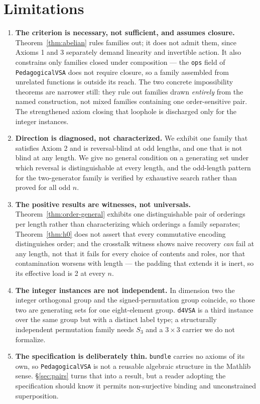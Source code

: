 \documentclass[10pt]{article}
\begin{document}
\section{Limitations}
\label{sec:limitations}

\begin{enumerate}
\item \textbf{The criterion is necessary, not sufficient, and assumes closure.} Theorem~\ref{thm:abelian} rules families out; it does not admit them, since Axioms 1 and 3 separately demand linearity and invertible action. It also constrains only families closed under composition --- the \texttt{ops} field of \texttt{PedagogicalVSA} does not require closure, so a family assembled from unrelated functions is outside its reach. The two concrete impossibility theorems are narrower still: they rule out families drawn \emph{entirely} from the named construction, not mixed families containing one order-sensitive pair. The strengthened axiom closing that loophole is discharged only for the integer instances.
\item \textbf{Direction is diagnosed, not characterized.} We exhibit one family that satisfies Axiom 2 and is reversal-blind at odd lengths, and one that is not blind at any length. We give no general condition on a generating set under which reversal is distinguishable at every length, and the odd-length pattern for the two-generator family is verified by exhaustive search rather than proved for all odd $n$.
\item \textbf{The positive results are witnesses, not universals.} Theorem~\ref{thm:order-general} exhibits one distinguishable pair of orderings per length rather than characterizing which orderings a family separates; Theorem~\ref{thm:h0} does not assert that every commutative encoding distinguishes order; and the crosstalk witness shows naive recovery \emph{can} fail at any length, not that it fails for every choice of contents and roles, nor that contamination worsens with length --- the padding that extends it is inert, so its effective load is 2 at every $n$.
\item \textbf{The integer instances are not independent.} In dimension two the integer orthogonal group and the signed-permutation group coincide, so those two are generating sets for one eight-element group. \texttt{d4VSA} is a third instance over the same group but with a distinct label type; a structurally independent permutation family needs $S_3$ and a $3\times3$ carrier we do not formalize.
\item \textbf{The specification is deliberately thin.} \texttt{bundle} carries no axioms of its own, so \texttt{PedagogicalVSA} is not a reusable algebraic structure in the Mathlib sense. \S\ref{sec:pairs} turns that into a result, but a reader adopting the specification should know it permits non-surjective binding and unconstrained superposition.

\end{enumerate}
\end{document}
